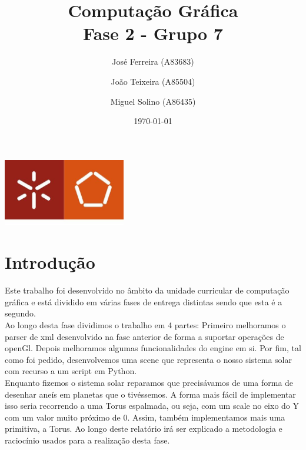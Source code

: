 \documentclass[a4paper]{report}
\begin{document}
\title{Computação Gráfica\\
\large Fase 2 - Grupo 7}
\author{José Ferreira (A83683) \and João Teixeira (A85504) \and Miguel Solino (A86435)}
\date{\today}

\begin{center}
    \begin{minipage}{0.75\linewidth}
        \centering
        \includegraphics[width=0.4\textwidth]{images/eng.jpeg}\par\vspace{1cm}
        \vspace{1.5cm}
        \href{https://www.uminho.pt/PT}
        {\color{black}{\scshape\LARGE Universidade do Minho}} \par
        \vspace{1cm}
        \href{https://www.di.uminho.pt/}
        {\color{black}{\scshape\Large Departamento de Informática}} \par
        \vspace{1.5cm}
        \maketitle
    \end{minipage}
\end{center}

\tableofcontents

\chapter{Introdução}
Este trabalho foi desenvolvido no âmbito da unidade curricular de computação
gráfica e está dividido em várias fases de entrega distintas sendo que esta é a
segundo.\\
Ao longo desta fase dividimos o trabalho em 4 partes:
Primeiro melhoramos o parser de xml desenvolvido na fase anterior de forma a
suportar operações de openGl. Depois melhoramos algumas funcionalidades do
engine em si. Por fim, tal como foi pedido, desenvolvemos uma scene que
representa o nosso sistema solar com recurso a um script em Python.\\
Enquanto fizemos o sistema solar reparamos que precisávamos de uma forma de
desenhar aneís em planetas que o tivéssemos. A forma mais fácil
de implementar isso seria recorrendo a uma Torus espalmada, ou seja, com um
scale no eixo do Y com um valor muito próximo de 0. Assim, também implementamos
mais uma primitiva, a Torus.
Ao longo deste relatório irá ser explicado a metodologia e raciocínio usados
para a realização desta fase.\\
\end{document}
